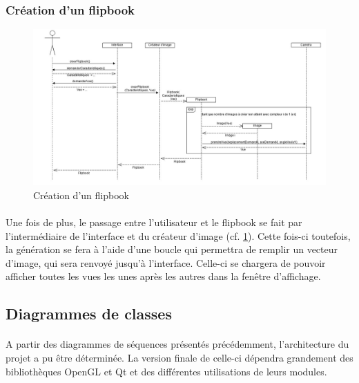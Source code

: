 \newpage

\subsubsection{Création d'un flipbook}

\begin{figure}[h]
		\centering
		\includegraphics[scale=0.4]{creerflipbook.jpg}
		\caption{\label{fig:creerFlip} Création d'un flipbook}
\end{figure}

\paragraph{}
Une fois de plus, le passage entre l’utilisateur et le flipbook se fait par l’intermédiaire de l’interface et du créateur d’image (cf. \ref{fig:creerFlip}). Cette fois-ci toutefois, la génération se fera à l’aide d’une boucle qui permettra de remplir un vecteur d’image, qui sera renvoyé jusqu’à l’interface. Celle-ci se chargera de pouvoir afficher toutes les vues les unes après les autres dans la fenêtre d’affichage.

\newpage

\subsection{Diagrammes de classes}

\paragraph{}
A partir des diagrammes de séquences présentés précédemment, l’architecture du projet a pu être déterminée. La version finale de celle-ci dépendra grandement des bibliothèques OpenGL et Qt et des différentes utilisations de leurs modules.

